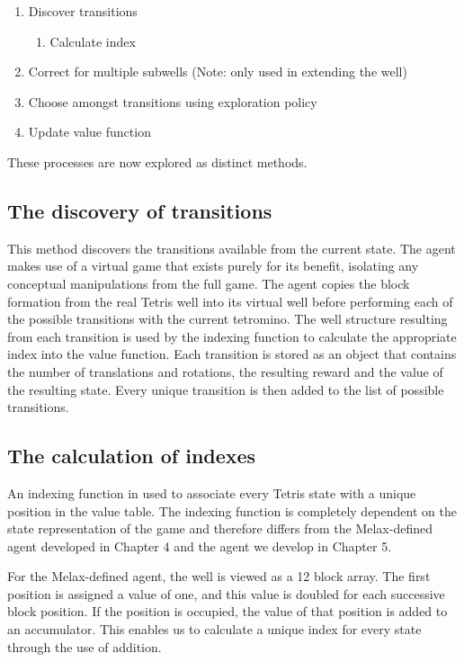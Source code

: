 \documentclass{rucsthesis}
\begin{document}
\begin{enumerate}
\item{Discover transitions}
\begin{enumerate}
\item{Calculate index}
\end{enumerate}
\item{Correct for multiple subwells (Note: only used in extending the well) }
\item{Choose amongst transitions using exploration policy}
\item{Update value function}
\end{enumerate}

These processes are now explored as distinct methods. 

\subsection{The discovery of transitions}

This method discovers the transitions available from the current state. The agent makes use of a virtual game that exists purely for its benefit, isolating any conceptual manipulations from the full game. The agent copies the block formation from the real Tetris well into its virtual well before performing each of the possible transitions with the current tetromino. The well structure resulting from each transition is used by the indexing function to calculate the appropriate index into the value function. Each transition is stored as an object that contains the number of translations and rotations, the resulting reward and the value of the resulting state.  Every unique transition is then added to the list of possible transitions.

\subsection{The calculation of indexes}

An indexing function in used to associate every Tetris state with a unique position in the value table. The indexing function is completely dependent on the state representation of the game and therefore differs from the Melax-defined agent developed in Chapter 4 and the agent we develop in Chapter 5.

For the Melax-defined agent, the well is viewed as a 12 block array. The first position is assigned a value of one, and this value is doubled for each successive block position. If the position is occupied, the value of that position is added to an accumulator. This enables us to calculate a unique index for every state through the use of addition.
\end{document}
